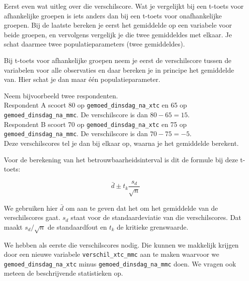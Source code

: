 \documentclass[
  letterpaper,
  DIV=11,
  numbers=noendperiod]{scrreprt}
\begin{document}
Eerst even wat uitleg over die verschilscore. Wat je vergelijkt bij een
t-toets voor afhankelijke groepen is iets anders dan bij een t-toets
voor onafhankelijke groepen. Bij de laatste bereken je eerst het
gemiddelde op een variabele voor beide groepen, en vervolgens vergelijk
je die twee gemiddeldes met elkaar. Je schat daarmee twee
populatieparameters (twee gemiddeldes).

Bij t-toets voor afhankelijke groepen neem je eerst de verschilscore
tussen de variabelen voor alle observaties en daar bereken je in
principe het gemiddelde van. Hier schat je dan maar één
populatieparameter.

\begin{tcolorbox}[enhanced jigsaw, arc=.35mm, bottomrule=.15mm, bottomtitle=1mm, breakable, colback=white, colbacktitle=quarto-callout-note-color!10!white, colframe=quarto-callout-note-color-frame, coltitle=black, left=2mm, leftrule=.75mm, opacityback=0, opacitybacktitle=0.6, rightrule=.15mm, title=\textcolor{quarto-callout-note-color}{\faInfo}\hspace{0.5em}{Uitleg over berekening verschilscore}, titlerule=0mm, toprule=.15mm, toptitle=1mm]

Neem bijvoorbeeld twee respondenten.\\
Respondent A scoort 80 op \texttt{gemoed\_dinsdag\_na\_xtc} en 65 op
\texttt{gemoed\_dinsdag\_na\_mmc}. De verschilscore is dan
\(80-65=15\).\\
Respondent B scoort 70 op \texttt{gemoed\_dinsdag\_na\_xtc} en 75 op
\texttt{gemoed\_dinsdag\_na\_mmc}. De verschilscore is dan
\(70-75=-5\).\\
Deze verschilscores tel je dan bij elkaar op, waarna je het gemiddelde
berekent.

\end{tcolorbox}

Voor de berekening van het betrouwbaarheidsinterval is dit de formule
bij deze t-toets:

\[
\bar{d} \pm t_k  \frac{s_d}{\sqrt{n}}
\]

We gebruiken hier \(\bar{d}\) om aan te geven dat het om het gemiddelde
van de verschilscores gaat. \(s_d\) staat voor de standaardeviatie van
die verschilscores. Dat maakt \(s_d/\sqrt{n}\) de standaardfout en
\(t_k\) de kritieke grenswaarde.

We hebben als eerste die verschilscores nodig. Die kunnen we makkelijk
krijgen door een nieuwe variabele \texttt{verschil\_xtc\_mmc} aan te
maken waarvoor we \texttt{gemoed\_dinsdag\_na\_xtc} minus
\texttt{gemoed\_dinsdag\_na\_mmc} doen. We vragen ook meteen de
beschrijvende statistieken op.
\end{document}
